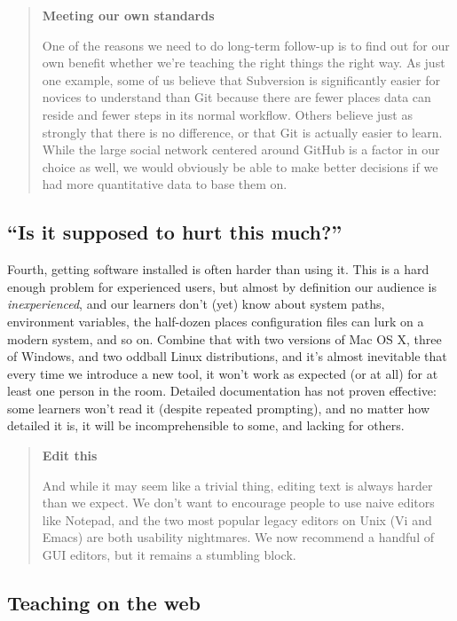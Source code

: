 \documentclass[10pt,a4paper,twocolumn]{article}
\begin{document}
\begin{quote}
\textbf{Meeting our own standards}

One of the reasons we need to do long-term follow-up is to find out
for our own benefit whether we're teaching the right things the right
way.  As just one example, some of us believe that Subversion is
significantly easier for novices to understand than Git because there
are fewer places data can reside and fewer steps in its normal
workflow. Others believe just as strongly that there is no difference,
or that Git is actually easier to learn. While the large social
network centered around GitHub is a factor in our choice as well, we
would obviously be able to make better decisions if we had more
quantitative data to base them on.
\end{quote}

\subsection*{``Is it supposed to hurt this much?''}

Fourth, getting software installed is often harder than using it. This
is a hard enough problem for experienced users, but almost by
definition our audience is \emph{inexperienced}, and our learners
don't (yet) know about system paths, environment variables, the
half-dozen places configuration files can lurk on a modern system, and
so on. Combine that with two versions of Mac OS X, three of Windows,
and two oddball Linux distributions, and it's almost inevitable that
every time we introduce a new tool, it won't work as expected (or at
all) for at least one person in the room. Detailed documentation has
not proven effective: some learners won't read it (despite repeated
prompting), and no matter how detailed it is, it will be
incomprehensible to some, and lacking for others.

\begin{quote}
\textbf{Edit this}

And while it may seem like a trivial thing, editing text is always
harder than we expect. We don't want to encourage people to use naive
editors like Notepad, and the two most popular legacy editors on Unix
(Vi and Emacs) are both usability nightmares. We now recommend a
handful of GUI editors, but it remains a stumbling block.
\end{quote}

\subsection*{Teaching on the web}
\end{document}
